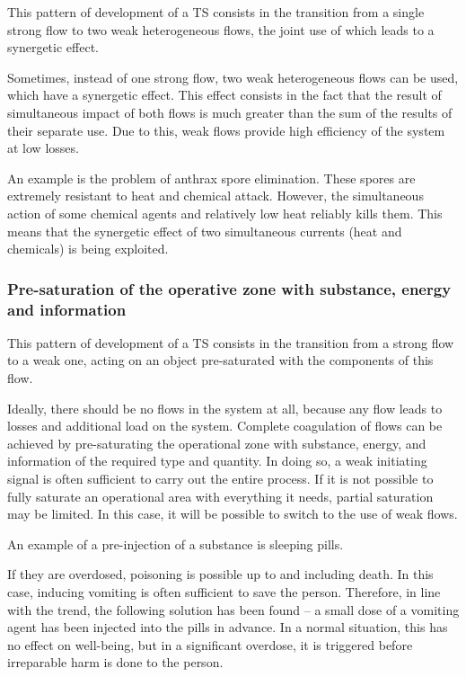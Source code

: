 \documentclass[a4paper,11pt]{article}
\begin{document}
This pattern of development of a TS consists in the transition from a single
strong flow to two weak heterogeneous flows, the joint use of which leads to
a synergetic effect.

Sometimes, instead of one strong flow, two weak heterogeneous flows can be
used, which have a synergetic effect. This effect consists in the fact that
the result of simultaneous impact of both flows is much greater than the sum
of the results of their separate use. Due to this, weak flows provide high
efficiency of the system at low losses.

An example is the problem of anthrax spore elimination. These spores are
extremely resistant to heat and chemical attack. However, the simultaneous
action of some chemical agents and relatively low heat reliably kills them.
This means that the synergetic effect of two simultaneous currents (heat and
chemicals) is being exploited.

\subsubsection{Pre-saturation of the operative zone with substance, energy and
  information} 

This pattern of development of a TS consists in the transition from a strong
flow to a weak one, acting on an object pre-saturated with the components of
this flow.

Ideally, there should be no flows in the system at all, because any flow leads
to losses and additional load on the system. Complete coagulation of flows can
be achieved by pre-saturating the operational zone with substance, energy, and
information of the required type and quantity. In doing so, a weak initiating
signal is often sufficient to carry out the entire process. If it is not
possible to fully saturate an operational area with everything it needs,
partial saturation may be limited. In this case, it will be possible to switch
to the use of weak flows.

An example of a pre-injection of a substance is sleeping pills.

If they are overdosed, poisoning is possible up to and including death. In
this case, inducing vomiting is often sufficient to save the person.
Therefore, in line with the trend, the following solution has been found -- a
small dose of a vomiting agent has been injected into the pills in advance.
In a normal situation, this has no effect on well-being, but in a significant
overdose, it is triggered before irreparable harm is done to the person.
\end{document}
